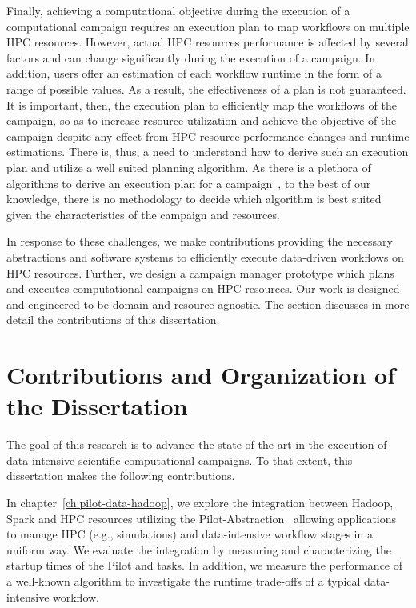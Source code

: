 Finally, achieving a computational objective during the execution of a
computational campaign requires an execution plan to map workflows on multiple
HPC resources. However, actual HPC resources performance is affected by several
factors and can change significantly during the execution of a campaign. In
addition, users offer an estimation of each workflow runtime in the form of a
range of possible values. As a result, the effectiveness of a plan is not
guaranteed. It is important, then, the execution plan to efficiently map the
workflows of the campaign, so as to increase resource utilization and achieve
the objective of the campaign despite any effect from HPC resource performance
changes and runtime estimations. There is, thus, a need to understand how to
derive such an execution plan and utilize a well suited planning algorithm. As
there is a plethora of algorithms to derive an execution plan for a
campaign~\cite{lu2019review}, to the best of our knowledge, there is no
methodology to decide which algorithm is best suited given the characteristics
of the campaign and resources.

In response to these challenges, we make contributions providing the necessary
abstractions and software systems to efficiently execute data-driven workflows
on HPC resources. Further, we design a campaign manager prototype which plans
and executes computational campaigns on HPC resources. Our work is designed and
engineered to be domain and resource agnostic. The section discusses in more
detail the contributions of this dissertation.

\section{Contributions and Organization of the Dissertation}

The goal of this research is to advance the state of the art in the execution
of data-intensive scientific computational campaigns. To that extent, this
dissertation makes the following contributions.

In chapter~\ref{ch:pilot-data-hadoop}, we explore the integration between
Hadoop, Spark and HPC resources utilizing the
Pilot-Abstraction~\cite{luckow2012pstar} allowing applications to manage HPC
(e.g., simulations) and data-intensive workflow stages in a uniform way. We
evaluate the integration by measuring and characterizing the startup times of
the Pilot and tasks. In addition, we measure the performance of a well-known
algorithm to investigate the runtime trade-offs of a typical data-intensive
workflow.

